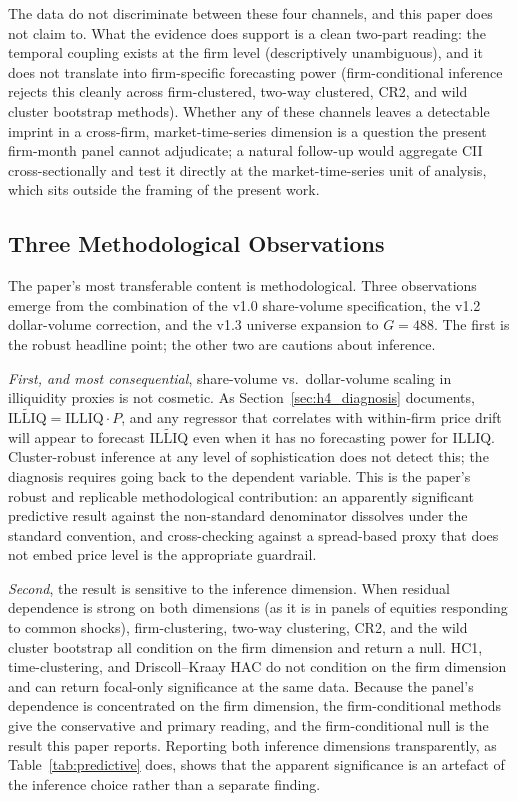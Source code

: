 \documentclass[preprint,12pt,authoryear]{elsarticle}
\begin{document}
The data do not discriminate between these four channels, and this paper does not claim to. What the evidence does support is a clean two-part reading: the temporal coupling exists at the firm level (descriptively unambiguous), and it does not translate into firm-specific forecasting power (firm-conditional inference rejects this cleanly across firm-clustered, two-way clustered, CR2, and wild cluster bootstrap methods). Whether any of these channels leaves a detectable imprint in a cross-firm, market-time-series dimension is a question the present firm-month panel cannot adjudicate; a natural follow-up would aggregate CII cross-sectionally and test it directly at the market-time-series unit of analysis, which sits outside the framing of the present work.

\subsection{Three Methodological Observations}

The paper's most transferable content is methodological. Three observations emerge from the combination of the v1.0 share-volume specification, the v1.2 dollar-volume correction, and the v1.3 universe expansion to $G = 488$. The first is the robust headline point; the other two are cautions about inference.

\emph{First, and most consequential}, share-volume vs.\ dollar-volume scaling in illiquidity proxies is not cosmetic. As Section~\ref{sec:h4_diagnosis} documents, $\widetilde{\mathrm{ILLIQ}} = \mathrm{ILLIQ} \cdot P$, and any regressor that correlates with within-firm price drift will appear to forecast $\widetilde{\mathrm{ILLIQ}}$ even when it has no forecasting power for $\mathrm{ILLIQ}$. Cluster-robust inference at any level of sophistication does not detect this; the diagnosis requires going back to the dependent variable. This is the paper's robust and replicable methodological contribution: an apparently significant predictive result against the non-standard denominator dissolves under the standard \citet{amihud2002illiquidity} convention, and cross-checking against a spread-based proxy that does not embed price level is the appropriate guardrail.

\emph{Second}, the result is sensitive to the inference dimension. When residual dependence is strong on both dimensions (as it is in panels of equities responding to common shocks), firm-clustering, two-way clustering, CR2, and the wild cluster bootstrap all condition on the firm dimension and return a null. HC1, time-clustering, and Driscoll--Kraay HAC do not condition on the firm dimension and can return focal-only significance at the same data. Because the panel's dependence is concentrated on the firm dimension, the firm-conditional methods give the conservative and primary reading, and the firm-conditional null is the result this paper reports. Reporting both inference dimensions transparently, as Table~\ref{tab:predictive} does, shows that the apparent significance is an artefact of the inference choice rather than a separate finding.
\end{document}
